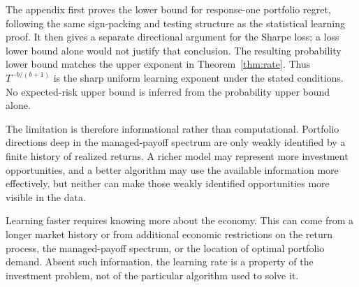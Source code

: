 The appendix first proves the lower bound for response-one portfolio regret,
following the same sign-packing and testing structure as the statistical
learning proof. It then gives a separate directional argument for the Sharpe
loss; a loss lower bound alone would not justify that conclusion. The resulting
probability lower bound matches the upper exponent in Theorem~\ref{thm:rate}.
Thus $T^{-b/(b+1)}$ is the sharp uniform learning exponent under the stated
conditions. No expected-risk upper bound is inferred from the probability
upper bound alone.

The limitation is therefore informational rather than computational. Portfolio
directions deep in the managed-payoff spectrum are only weakly identified by a
finite history of realized returns. A richer model may represent more
investment opportunities, and a better algorithm may use the available
information more effectively, but neither can make those weakly identified
opportunities more visible in the data.

Learning faster requires knowing more about the economy. This can come from a
longer market history or from additional economic restrictions on the return
process, the managed-payoff spectrum, or the location of optimal portfolio
demand. Absent such information, the learning rate is a property of the
investment problem, not of the particular algorithm used to solve it.
